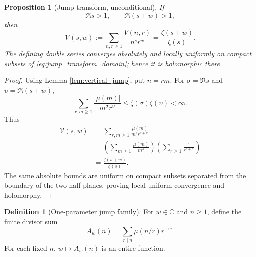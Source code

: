 \documentclass[11pt]{amsart}
\numberwithin{equation}{section}
\theoremstyle{plain}
\newtheorem{proposition}[theorem]{Proposition}
\theoremstyle{definition}
\newtheorem{definition}[theorem]{Definition}
\theoremstyle{remark}
\newcommand{\C}{\mathbb C}
\newcommand{\mob}{\mu}
\newcommand{\Vjump}{V}
\begin{document}
\begin{proposition}[Jump transform, unconditional]
\label{prop:jump_transform}
If
\begin{equation}
\Re s>1,
\qquad
\Re(s+w)>1,
\label{eq:jump_transform_domain}
\end{equation}
then
\begin{equation}
\mathscr V(s,w)
:=\sum_{n,r\ge1}\frac{\Vjump(n,r)}{n^s r^w}
=\frac{\zeta(s+w)}{\zeta(s)}.
\label{eq:jump_transform}
\end{equation}
The defining double series converges absolutely and locally uniformly on compact subsets of \eqref{eq:jump_transform_domain}; hence it is holomorphic there.
\end{proposition}

\begin{proof}
Using Lemma \ref{lem:vertical_jump}, put $n=rm$.  For $\sigma=\Re s$ and $\upsilon=\Re(s+w)$,
\begin{equation}
\sum_{r,m\ge1}\frac{|\mob(m)|}{m^\sigma r^\upsilon}
\le \zeta(\sigma)\zeta(\upsilon)<\infty.
\label{eq:jump_absolute_bound}
\end{equation}
Thus
\begin{align}
\mathscr V(s,w)
&=\sum_{r,m\ge1}\frac{\mob(m)}{m^s r^{s+w}}
\label{eq:jump_transform_expand}\\
&=\left(\sum_{m\ge1}\frac{\mob(m)}{m^s}\right)
\left(\sum_{r\ge1}\frac1{r^{s+w}}\right)
\label{eq:jump_transform_factor}\\
&=\frac{\zeta(s+w)}{\zeta(s)}.
\label{eq:jump_transform_finish}
\end{align}
The same absolute bounds are uniform on compact subsets separated from the boundary of the two half-planes, proving local uniform convergence and holomorphy.
\end{proof}

\begin{definition}[One-parameter jump family]
\label{def:Aw}
For $w\in\C$ and $n\ge1$, define the finite divisor sum
\begin{equation}
A_w(n)=\sum_{r\mid n}\mob(n/r)r^{-w}.
\label{eq:Aw_definition}
\end{equation}
For each fixed $n$, $w\mapsto A_w(n)$ is an entire function.
\end{definition}
\end{document}
